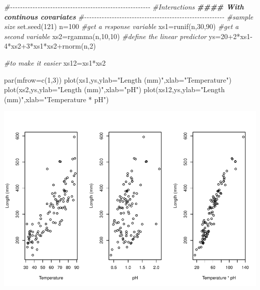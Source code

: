 \documentclass[
]{book}
\newenvironment{Shaded}{\begin{snugshade}}{\end{snugshade}}
\newcommand{\AttributeTok}[1]{\textcolor[rgb]{0.77,0.63,0.00}{#1}}
\newcommand{\CommentTok}[1]{\textcolor[rgb]{0.56,0.35,0.01}{\textit{#1}}}
\newcommand{\DecValTok}[1]{\textcolor[rgb]{0.00,0.00,0.81}{#1}}
\newcommand{\DocumentationTok}[1]{\textcolor[rgb]{0.56,0.35,0.01}{\textbf{\textit{#1}}}}
\newcommand{\FunctionTok}[1]{\textcolor[rgb]{0.00,0.00,0.00}{#1}}
\newcommand{\NormalTok}[1]{#1}
\newcommand{\OtherTok}[1]{\textcolor[rgb]{0.56,0.35,0.01}{#1}}
\newcommand{\SpecialCharTok}[1]{\textcolor[rgb]{0.00,0.00,0.00}{#1}}
\newcommand{\StringTok}[1]{\textcolor[rgb]{0.31,0.60,0.02}{#1}}
\begin{document}
\begin{Shaded}
\begin{Highlighting}[]
\CommentTok{\#{-}{-}{-}{-}{-}{-}{-}{-}{-}{-}{-}{-}{-}{-}{-}{-}{-}{-}{-}{-}{-}{-}{-}{-}{-}{-}{-}{-}{-}{-}{-}{-}{-}{-}{-}{-}{-}{-}{-}{-}{-}{-}{-}{-}{-}{-}{-}{-}{-}{-}{-}{-}{-}{-}{-}{-}}
\CommentTok{\#Interactions}
\DocumentationTok{\#\#\#\# With continous covariates}
\CommentTok{\#{-}{-}{-}{-}{-}{-}{-}{-}{-}{-}{-}{-}{-}{-}{-}{-}{-}{-}{-}{-}{-}{-}{-}{-}{-}{-}{-}{-}{-}{-}{-}{-}{-}{-}{-}{-}{-}{-}{-}{-}{-}{-}{-}{-}{-}{-}{-}{-}{-}{-}{-}{-}{-}{-}{-}{-}}
\CommentTok{\#sample size}
\FunctionTok{set.seed}\NormalTok{(}\DecValTok{121}\NormalTok{)}
\NormalTok{n}\OtherTok{=}\DecValTok{100}
\CommentTok{\#get a response variable}
\NormalTok{xs1}\OtherTok{=}\FunctionTok{runif}\NormalTok{(n,}\DecValTok{30}\NormalTok{,}\DecValTok{90}\NormalTok{)}
\CommentTok{\#get a second variable}
\NormalTok{xs2}\OtherTok{=}\FunctionTok{rgamma}\NormalTok{(n,}\DecValTok{10}\NormalTok{,}\DecValTok{10}\NormalTok{)}
\CommentTok{\#define the linear predictor}
\NormalTok{ys}\OtherTok{=}\DecValTok{20}\SpecialCharTok{+}\DecValTok{2}\SpecialCharTok{*}\NormalTok{xs1}\DecValTok{{-}4}\SpecialCharTok{*}\NormalTok{xs2}\SpecialCharTok{+}\DecValTok{3}\SpecialCharTok{*}\NormalTok{xs1}\SpecialCharTok{*}\NormalTok{xs2}\SpecialCharTok{+}\FunctionTok{rnorm}\NormalTok{(n,}\DecValTok{2}\NormalTok{)}

\CommentTok{\#to make it easier}
\NormalTok{xs12}\OtherTok{=}\NormalTok{xs1}\SpecialCharTok{*}\NormalTok{xs2}

\FunctionTok{par}\NormalTok{(}\AttributeTok{mfrow=}\FunctionTok{c}\NormalTok{(}\DecValTok{1}\NormalTok{,}\DecValTok{3}\NormalTok{))}
\FunctionTok{plot}\NormalTok{(xs1,ys,}\AttributeTok{ylab=}\StringTok{"Length (mm)"}\NormalTok{,}\AttributeTok{xlab=}\StringTok{"Temperature"}\NormalTok{)}
\FunctionTok{plot}\NormalTok{(xs2,ys,}\AttributeTok{ylab=}\StringTok{"Length (mm)"}\NormalTok{,}\AttributeTok{xlab=}\StringTok{"pH"}\NormalTok{)}
\FunctionTok{plot}\NormalTok{(xs12,ys,}\AttributeTok{ylab=}\StringTok{"Length (mm)"}\NormalTok{,}\AttributeTok{xlab=}\StringTok{"Temperature * pH"}\NormalTok{)}
\end{Highlighting}
\end{Shaded}

\includegraphics{ECOMODbook_files/figure-latex/a12.1-1.pdf}
\end{document}
